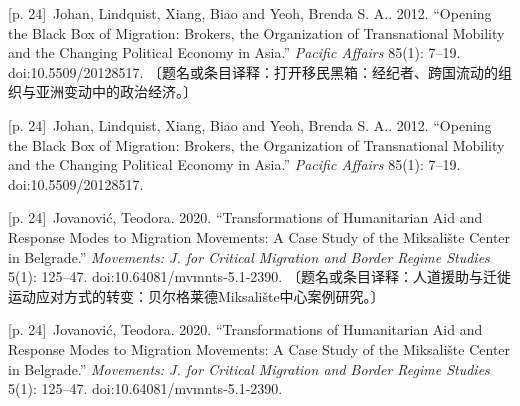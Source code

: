 \documentclass[10pt,a4paper]{article}
\begin{document}
\noindent\begin{minipage}{\textwidth}\begin{minipage}[t]{\dimexpr.5\textwidth-4mm\relax}{\scriptsize\color{gray} [p. 24]}\ Johan, Lindquist, Xiang, Biao and Yeoh, Brenda S. A.. 2012. “Opening the Black Box of Migration: Brokers, the Organization of Transnational Mobility and the Changing Political Economy in Asia.” \textit{Pacific Affairs} 85(1): 7–19. doi:10.5509/20128517. 〔题名或条目译释：打开移民黑箱：经纪者、跨国流动的组织与亚洲变动中的政治经济。〕\par\end{minipage}\hfill\begin{minipage}[t]{\dimexpr.5\textwidth-4mm\relax}{\scriptsize\color{gray} [p. 24]}\ Johan, Lindquist, Xiang, Biao and Yeoh, Brenda S. A.. 2012. “Opening the Black Box of Migration: Brokers, the Organization of Transnational Mobility and the Changing Political Economy in Asia.” \textit{Pacific Affairs} 85(1): 7–19. doi:10.5509/20128517.\par\end{minipage}\end{minipage}\par
\noindent\begin{minipage}{\textwidth}\begin{minipage}[t]{\dimexpr.5\textwidth-4mm\relax}{\scriptsize\color{gray} [p. 24]}\ Jovanović, Teodora. 2020. “Transformations of Humanitarian Aid and Response Modes to Migration Movements: A Case Study of the Miksalište Center in Belgrade.” \textit{Movements: J. for Critical Migration and Border Regime Studies} 5(1): 125–47. doi:10.64081/mvmnts-5.1-2390. 〔题名或条目译释：人道援助与迁徙运动应对方式的转变：贝尔格莱德Miksalište中心案例研究。〕\par\end{minipage}\hfill\begin{minipage}[t]{\dimexpr.5\textwidth-4mm\relax}{\scriptsize\color{gray} [p. 24]}\ Jovanović, Teodora. 2020. “Transformations of Humanitarian Aid and Response Modes to Migration Movements: A Case Study of the Miksalište Center in Belgrade.” \textit{Movements: J. for Critical Migration and Border Regime Studies} 5(1): 125–47. doi:10.64081/mvmnts-5.1-2390.\par\end{minipage}\end{minipage}\par
\end{document}
